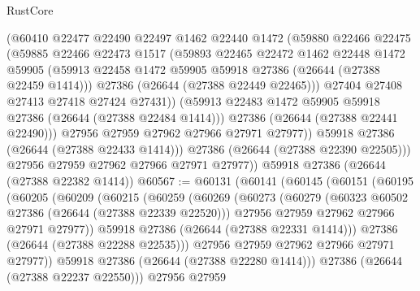 \begin{lexlean}{RustCore}
\begin{coremodule}
                (@60410
                  @22477
                  @22490
                  @22497
                  @1462
                  @22440
                  @1472
                  (@59880
                    @22466
                    @22475
                    (@59885
                      @22466
                      @22473
                      @1517
                      (@59893
                        @22465
                        @22472
                        @1462
                        @22448
                        @1472
                        @59905
                        (@59913 @22458 @1472 @59905 @59918 @27386 (@26644 (@27388 @22459 @1414)))
                        @27386
                        (@26644 (@27388 @22449 @22465)))
                      @27404
                      @27408
                      @27413
                      @27418
                      @27424
                      @27431))
                  (@59913 @22483 @1472 @59905 @59918 @27386 (@26644 (@27388 @22484 @1414)))
                  @27386
                  (@26644 (@27388 @22441 @22490)))
                @27956
                @27959
                @27962
                @27966
                @27971
                @27977))
            @59918
            @27386
            (@26644 (@27388 @22433 @1414)))
          @27386
          (@26644 (@27388 @22390 @22505)))
        @27956
        @27959
        @27962
        @27966
        @27971
        @27977))
    @59918
    @27386
    (@26644 (@27388 @22382 @1414))
@60567 := @60131
    (@60141
      (@60145
        (@60151
          (@60195
            (@60205
              (@60209
                (@60215
                  (@60259
                    (@60269
                      (@60273
                        (@60279
                          (@60323 @60502 @27386 (@26644 (@27388 @22339 @22520)))
                          @27956
                          @27959
                          @27962
                          @27966
                          @27971
                          @27977))
                      @59918
                      @27386
                      (@26644 (@27388 @22331 @1414)))
                    @27386
                    (@26644 (@27388 @22288 @22535)))
                  @27956
                  @27959
                  @27962
                  @27966
                  @27971
                  @27977))
              @59918
              @27386
              (@26644 (@27388 @22280 @1414)))
            @27386
            (@26644 (@27388 @22237 @22550)))
          @27956
          @27959

\end{coremodule}
\end{lexlean}
